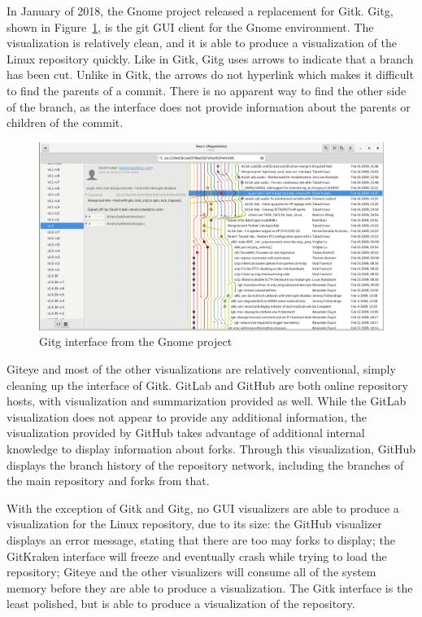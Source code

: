 In January of 2018, the Gnome project released a replacement for Gitk.
Gitg\cite{gitg},
shown in Figure~\ref{fig:gitg_screenshot},
is the git GUI client for the Gnome environment.
The visualization is relatively clean, and it is able to produce a
visualization of the Linux repository quickly.
Like in Gitk, Gitg uses arrows to indicate that a branch has been cut.
Unlike in Gitk, the arrows do not hyperlink which makes it difficult to
find the parents of a commit.
There is no apparent way to find the other side of the branch,
as the interface does not provide information about the parents or
children of the commit.

\begin{figure}[htpb]
  \centering
  \includegraphics[width=0.8\linewidth]{Figures/introduction/gitg.png}
  \caption{Gitg interface from the Gnome project\cite{gitg}}
  \label{fig:gitg_screenshot}
\end{figure}

Giteye\cite{giteye} and most of the other visualizations are relatively
conventional, simply cleaning up the interface of Gitk.
GitLab\cite{gitlab} and
GitHub\cite{github} are both online repository hosts, with
visualization and summarization provided as well. While the GitLab
visualization does not appear to provide any additional information, the
visualization provided by GitHub takes advantage of additional internal
knowledge to display information about forks. Through this
visualization, GitHub displays the branch history of the repository
network, including the branches of the main repository and forks from
that.

With the exception of Gitk and Gitg, no GUI visualizers
are able to produce a visualization for the Linux repository, due to its
size: the GitHub visualizer displays an error message, stating that
there are too may forks to display; the GitKraken interface will freeze
and eventually crash while trying to load the repository; Giteye
and the other visualizers will consume all of the system memory before
they are able to produce a visualization. The Gitk interface is the
least polished, but is able to produce a visualization of the
repository.

